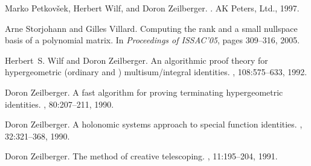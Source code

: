 \documentclass{sig-alternate}
\begin{document}
\begin{thebibliography}{10}
Marko Petkov{\v s}ek, Herbert Wilf, and Doron Zeilberger.
\newblock {\em }.
\newblock AK Peters, Ltd., 1997.

Arne Storjohann and Gilles Villard.
\newblock Computing the rank and a small nullspace basis of a polynomial
  matrix.
\newblock In {\em Proceedings of ISSAC'05}, pages 309--316, 2005.

Herbert~S. Wilf and Doron Zeilberger.
\newblock An algorithmic proof theory for hypergeometric (ordinary and )
  multisum/integral identities.
, 108:575--633, 1992.

Doron Zeilberger.
\newblock A fast algorithm for proving terminating hypergeometric identities.
, 80:207--211, 1990.

Doron Zeilberger.
\newblock A holonomic systems approach to special function identities.
, 32:321--368,
  1990.

Doron Zeilberger.
\newblock The method of creative telescoping.
, 11:195--204, 1991.

\end{thebibliography}
\end{document}
